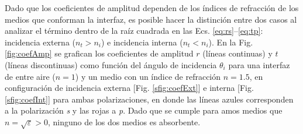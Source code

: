 Dado que los coeficientes  de amplitud dependen de los índices de refracción de los medios que conforman la interfaz, es posible hacer la distinción entre dos casos al analizar el término dentro de la raíz cuadrada en las Ecs. \eqref{eq:rs}--\eqref{eq:tp}: incidencia externa ($n_t>n_i$) e incidencia interna ($n_t<n_i$). En la Fig. \ref{fig:coefAmp} se grafican los coeficientes de amplitud $r$ (líneas continuas) y $t$ (líneas discontinuas) como función del ángulo de incidencia $\theta_i$ para una interfaz de entre aire ($n= 1$) y un medio con un índice de refracción $n = 1.5$, en configuración de incidencia externa [Fig. \ref{sfig:coefExt}] e interna [Fig. \ref{sfig:coefInt}] para ambas polarizaciones, en donde las líneas azules corresponden a la polarización \emph{s} y las rojas a \emph{p}. Dado que se cumple para amos medios que $n = \sqrt{\varepsilon}>0$, ninguno de los dos medios es absorbente. 
%
